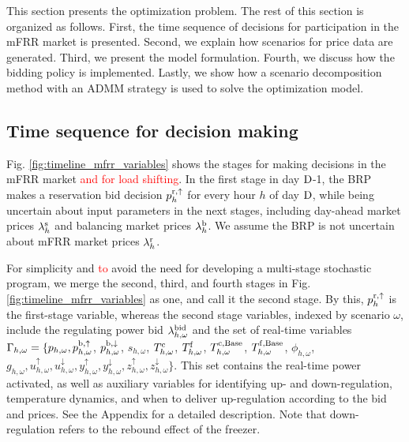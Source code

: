 \documentclass[11pt,a4paper]{article}
\begin{document}
This section presents the optimization problem. The rest of this section is organized as follows. First, the time sequence of decisions for participation in the mFRR market is presented. Second, we explain how scenarios for price data are generated. Third, we present the model formulation. Fourth, we discuss how the bidding policy is implemented. Lastly, we show how a scenario decomposition method with an ADMM strategy is used to solve the optimization model.

\subsection{Time sequence for decision making}
Fig. \ref{fig:timeline_mfrr_variables} shows the stages for making decisions in the mFRR market \textcolor{red}{and for load shifting}. In the first stage in day $\rm{D}$-1, the BRP makes a reservation bid decision $p_{h}^{\rm{r},\uparrow}$ for every hour $h$ of day $\rm{D}$,  while being uncertain about input parameters in the next stages, including day-ahead market prices $ \lambda_{h}^{\rm{s}}$  and balancing market prices $ \lambda_{h}^{\rm{b}}$. We assume the BRP is not uncertain about mFRR market prices $ \lambda_{h}^{\rm{r}}$.

For simplicity and \textcolor{red}{to} avoid the need for developing a multi-stage stochastic program, we merge the second, third, and fourth stages in Fig. \ref{fig:timeline_mfrr_variables} as one, and call it the second stage. By this, $p_{h}^{\rm{r},\uparrow}$ is the first-stage variable, whereas the second stage variables, indexed by scenario $\omega$, include
the regulating power bid $\lambda_{h,\omega}^{\rm{bid}}$ and the set of real-time variables $\Gamma_{h,\omega} = \{ p_{h,\omega}, p_{h,\omega}^{\rm{b},\uparrow}$, $p_{h,\omega}^{\rm{b},\downarrow}$, $s_{h,\omega}$, $T_{h,\omega}^{\rm{c}}$, $T_{h,\omega}^{\rm{f}}$, $T_{h,\omega}^{\rm{c,\text{Base}}}$, $T_{h,\omega}^{\rm{f,\text{Base}}}$, $\phi_{h,\omega}$, $g_{h,\omega}, u^{\uparrow}_{h,\omega}, u^{\downarrow}_{h,\omega}, y^{\uparrow}_{h,\omega}, y^{\downarrow}_{h,\omega}, z^{\uparrow}_{h,\omega}, z^{\downarrow}_{h,\omega} \}$. This set contains the real-time power activated, as well as auxiliary variables for identifying up- and down-regulation,  temperature dynamics, and when to deliver up-regulation according to the bid and prices. See the Appendix for a detailed description. Note that down-regulation refers to the rebound effect of the freezer.
\end{document}
